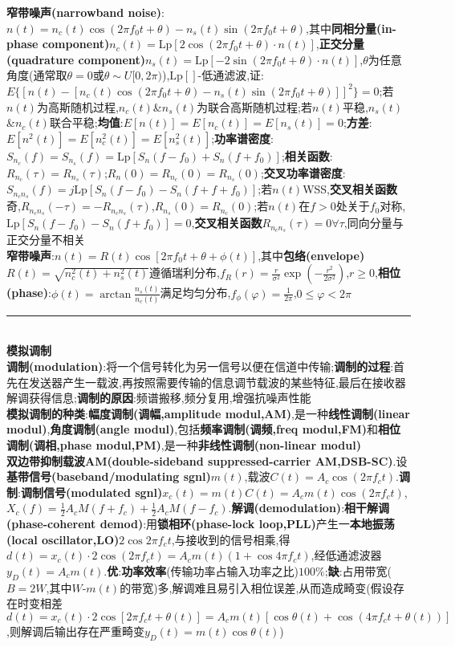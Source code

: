 \documentclass[UTF8,a4paper,10pt]{article}
\begin{document}
\begin{multicols}{2}
    \textbf{窄带噪声(narrowband noise)}:$n(t)=n_c(t)\cos(2\pi f_0t+\theta)-n_s(t)\sin(2\pi f_0t+\theta)$,其中\textbf{同相分量(in-phase component)}$n_c(t)=\text{Lp}[2\cos(2\pi f_0t+\theta)\cdot n(t)]$,\textbf{正交分量(quadrature component)}$n_s(t)=\text{Lp}[-2\sin(2\pi f_0t+\theta)\cdot n(t)]$,$\theta$为任意角度(通常取$\theta=0$或$\theta\sim U[0,2\pi)$),$\text{Lp}[]$-低通滤波,证:$E\{[n(t)-[n_c(t)\cos(2\pi f_0t+\theta)-n_s(t)\sin(2\pi f_0t+\theta)]]^2\}=0$;若$n(t)$为高斯随机过程,$n_c(t)$\&$n_s(t)$为联合高斯随机过程;若$n(t)$平稳,$n_s(t)$\&$n_c(t)$联合平稳;\textbf{均值}:$E[n(t)]=E[n_c(t)]=E[n_s(t)]=0$;\textbf{方差}:$E[n^2(t)]=E[n_c^2(t)]=E[n_s^2(t)]$;\textbf{功率谱密度}:$S_{n_c}(f)=S_{n_s}(f)=\text{Lp}[S_n(f-f_0)+S_n(f+f_0)]$;\textbf{相关函数}:$R_{n_c}(\tau)=R_{n_s}(\tau)$;$R_n(0)=R_{n_c}(0)=R_{n_s}(0)$;\textbf{交叉功率谱密度}:$S_{n_cn_s}(f)=j\text{Lp}[S_n(f-f_0)-S_n(f+f+f_0)]$;若$n(t)$WSS,\textbf{交叉相关函数}奇,$R_{n_cn_s}(-\tau)=-R_{n_cn_s}(\tau)$,$R_{n_s}(0)=R_{n_c}(0)$;若$n(t)$在$f>0$处关于$f_0$对称,$\text{Lp}[S_n(f-f_0)-S_n(f+f_0)]=0$,\textbf{交叉相关函数}$R_{n_cn_s}(\tau)=0\forall\tau$,同向分量与正交分量不相关\\
    \textbf{窄带噪声}:$n(t)=R(t)\cos[2\pi f_0t+\theta+\phi(t)]$,其中\textbf{包络(envelope)}$R(t)=\sqrt{n_c^2(t)+n_s^2(t)}$遵循瑞利分布,$f_R(r)=\frac{r}{\sigma^2}\exp(-\frac{r^2}{2\sigma^2})$,$r\geq 0$,\textbf{相位(phase)}:$\phi(t)=\arctan\frac{n_s(t)}{n_c(t)}$满足均匀分布,$f_{\phi}(\varphi)=\frac{1}{2\pi}$,$0\leq\varphi<2\pi$\\
    \rule{\columnwidth}{.5pt}\\
    \textbf{模拟调制}\\
    \textbf{调制(modulation)}:将一个信号转化为另一信号以便在信道中传输;\textbf{调制的过程}:首先在发送器产生一载波,再按照需要传输的信息调节载波的某些特征,最后在接收器解调获得信息;\textbf{调制的原因}:频谱搬移,频分复用,增强抗噪声性能\\
    \textbf{模拟调制的种类}:\textbf{幅度调制(调幅,amplitude modul,AM)},是一种\textbf{线性调制(linear modul)},\textbf{角度调制(angle modul)},包括\textbf{频率调制(调频,freq modul,FM)}和\textbf{相位调制(调相,phase modul,PM)},是一种\textbf{非线性调制(non-linear modul)}\\
    \textbf{双边带抑制载波AM(double-sideband suppressed-carrier AM,DSB-SC)}.设\textbf{基带信号(baseband/modulating sgnl)}$m(t)$,载波$C(t)=A_c\cos(2\pi f_ct)$.\textbf{调制}:\textbf{调制信号(modulated sgnl)}$x_c(t)=m(t)C(t)=A_cm(t)\cos(2\pi f_ct)$,$X_c(f)=\frac{1}{2}A_cM(f+f_c)+\frac{1}{2}A_cM(f-f_c)$.\textbf{解调(demodulation)}:\textbf{相干解调(phase-coherent demod)}:用\textbf{锁相环(phase-lock loop,PLL)}产生一\textbf{本地振荡(local oscillator,LO)}$2\cos 2\pi f_ct$,与接收到的信号相乘,得$d(t)=x_c(t)\cdot 2\cos(2\pi f_ct)=A_cm(t)(1+\cos 4\pi f_ct)$,经低通滤波器$y_D(t)=A_cm(t)$.\textbf{优}:\textbf{功率效率}(传输功率占输入功率之比)$100\%$;\textbf{缺}:占用带宽($B=2W$,其中$W$-$m(t)$的带宽)多,解调难且易引入相位误差,从而造成畸变(假设存在时变相差$d(t)=x_c(t)\cdot 2\cos[2\pi f_ct+\theta(t)]=A_cm(t)[\cos\theta(t)+\cos(4\pi f_ct+\theta(t))]$,则解调后输出存在严重畸变$y_D(t)=m(t)\cos\theta(t)$)\\

\end{multicols}
\end{document}

